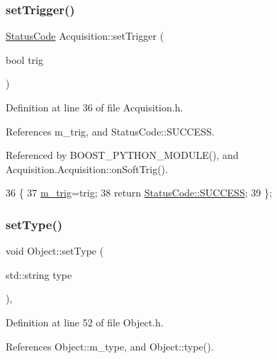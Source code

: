 \subsubsection{\texorpdfstring{set\+Trigger()}{setTrigger()}}
{\footnotesize\ttfamily \hyperlink{classStatusCode}{Status\+Code} Acquisition\+::set\+Trigger (\begin{DoxyParamCaption}\item[{bool}]{trig }\end{DoxyParamCaption})\hspace{0.3cm}{\ttfamily [inline]}}



Definition at line 36 of file Acquisition.\+h.



References m\+\_\+trig, and Status\+Code\+::\+S\+U\+C\+C\+E\+SS.



Referenced by B\+O\+O\+S\+T\+\_\+\+P\+Y\+T\+H\+O\+N\+\_\+\+M\+O\+D\+U\+L\+E(), and Acquisition.\+Acquisition\+::on\+Soft\+Trig().


\begin{DoxyCode}
36                                    \{
37     \hyperlink{classAcquisition_a953bdc1bf56206b6df33b648af32a24f}{m\_trig}=trig; 
38     \textcolor{keywordflow}{return} \hyperlink{classStatusCode_a6f565cbeadc76d14c72f047e5e85eb4badd0da38d3ba0d922efd1f4619bc37ad8}{StatusCode::SUCCESS};
39   \};
\end{DoxyCode}
\mbox{\label{classObject_aae534cc9d982bcb9b99fd505f2e103a5}} 
\subsubsection{\texorpdfstring{set\+Type()}{setType()}}
{\footnotesize\ttfamily void Object\+::set\+Type (\begin{DoxyParamCaption}\item[{std\+::string}]{type }\end{DoxyParamCaption})\hspace{0.3cm}{\ttfamily [inline]}, {\ttfamily [inherited]}}



Definition at line 52 of file Object.\+h.



References Object\+::m\+\_\+type, and Object\+::type().



